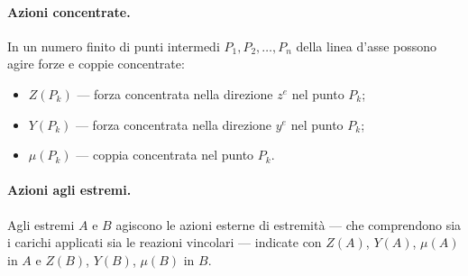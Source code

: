 \paragraph{Azioni concentrate.}
In un numero finito di punti intermedi $P_1, P_2,
\ldots, P_n$ della linea d'asse possono agire forze
e coppie concentrate:
\begin{itemize}[nosep]
	\item $Z(P_k)$ --- forza concentrata nella
	direzione $z^e$ nel punto $P_k$;
	\item $Y(P_k)$ --- forza concentrata nella
	direzione $y^e$ nel punto $P_k$;
	\item $\mu(P_k)$ --- coppia concentrata nel
	punto $P_k$.
\end{itemize}

\paragraph{Azioni agli estremi.}
Agli estremi $A$ e $B$ agiscono le azioni esterne
di estremità --- che comprendono sia i carichi
applicati sia le reazioni vincolari --- indicate
con $Z(A)$, $Y(A)$, $\mu(A)$ in $A$ e $Z(B)$,
$Y(B)$, $\mu(B)$ in $B$.

